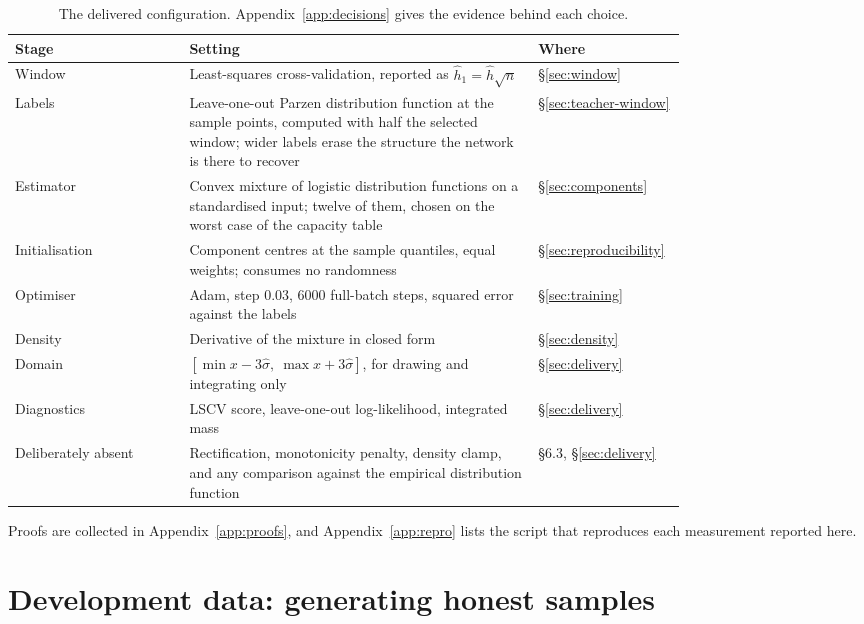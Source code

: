 \documentclass[11pt]{article}
\newcommand{\shat}{\hat{\sigma}}
\newcommand{\hhat}{\hat{h}}
\begin{document}
\begin{table}[H]
\centering
\begin{tabular}{@{}>{\raggedright\arraybackslash}p{0.26\linewidth}%
                  >{\raggedright\arraybackslash}p{0.52\linewidth}l@{}}
\toprule
\textbf{Stage} & \textbf{Setting} & \textbf{Where} \\
\midrule
Window &
  Least-squares cross-validation, reported as $\hhat_1 = \hhat\sqrt n$ &
  \S\ref{sec:window} \\
Labels &
  Leave-one-out Parzen distribution function at the sample points, computed with half the
  selected window; wider labels erase the structure the network is there to recover &
  \S\ref{sec:teacher-window} \\
Estimator &
  Convex mixture of logistic distribution functions on a standardised input; twelve of them,
  chosen on the worst case of the capacity table &
  \S\ref{sec:components} \\
Initialisation &
  Component centres at the sample quantiles, equal weights; consumes no randomness &
  \S\ref{sec:reproducibility} \\
Optimiser &
  Adam, step $0.03$, $6000$ full-batch steps, squared error against the labels &
  \S\ref{sec:training} \\
Density &
  Derivative of the mixture in closed form &
  \S\ref{sec:density} \\
Domain &
  $[\min x - 3\shat,\ \max x + 3\shat]$, for drawing and integrating only &
  \S\ref{sec:delivery} \\
Diagnostics &
  LSCV score, leave-one-out log-likelihood, integrated mass &
  \S\ref{sec:delivery} \\
Deliberately absent &
  Rectification, monotonicity penalty, density clamp, and any comparison against the
  empirical distribution function &
  \S6.3, \S\ref{sec:delivery} \\
\bottomrule
\end{tabular}
\caption{The delivered configuration. Appendix~\ref{app:decisions} gives the evidence behind
each choice.}
\label{tab:setup}
\end{table}

Proofs are collected in Appendix~\ref{app:proofs}, and Appendix~\ref{app:repro} lists the
script that reproduces each measurement reported here.

\section{Development data: generating honest samples}
\end{document}
